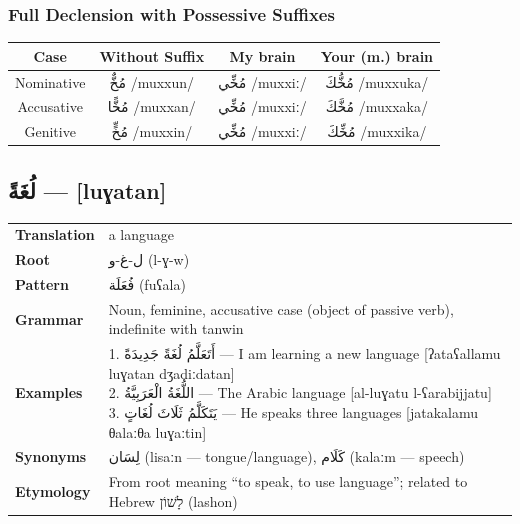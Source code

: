 \documentclass[letterpaper,12pt]{article}
\begin{document}
\subsubsection*{Full Declension with Possessive Suffixes}
\begin{tabular}{|c|c|c|c|}
\hline
\textbf{Case} & \textbf{Without Suffix} & \textbf{My brain} & \textbf{Your (m.) brain} \\
\hline
Nominative & \textarabic{مُخٌّ} /muxxun/ & \textarabic{مُخِّي} /muxxiː/ & \textarabic{مُخُّكَ} /muxxuka/ \\
\hline
Accusative & \textarabic{مُخًّا} /muxxan/ & \textarabic{مُخِّي} /muxxiː/ & \textarabic{مُخَّكَ} /muxxaka/ \\
\hline
Genitive & \textarabic{مُخٍّ} /muxxin/ & \textarabic{مُخِّي} /muxxiː/ & \textarabic{مُخِّكَ} /muxxika/ \\
\hline
\end{tabular}

\subsection{\textarabic{لُغَةً} — [luɣatan]}
\begin{tabular}{p{3cm}p{10cm}}
\toprule
\textbf{Translation} & a language \\
\textbf{Root} & \textarabic{ل-غ-و} (l-ɣ-w) \\
\textbf{Pattern} & \textarabic{فُعَلَة} (fuʕala) \\
\textbf{Grammar} & Noun, feminine, accusative case (object of passive verb), indefinite with tanwin \\
\midrule
\textbf{Examples} & \makecell[l]{\parbox{9.5cm}{
1. \textarabic{أَتَعَلَّمُ لُغَةً جَدِيدَةً} — I am learning a new language [ʔataʕallamu luɣatan dʒadiːdatan]\\
2. \textarabic{اللُّغَةُ الْعَرَبِيَّةُ} — The Arabic language [al-luɣatu l-ʕarabijjatu]\\
3. \textarabic{يَتَكَلَّمُ ثَلَاثَ لُغَاتٍ} — He speaks three languages [jatakalamu θalaːθa luɣaːtin]
}} \\
\midrule
\textbf{Synonyms} & \textarabic{لِسَان} (lisaːn — tongue/language), \textarabic{كَلَام} (kalaːm — speech) \\
\textbf{Etymology} & From root meaning ``to speak, to use language''; related to Hebrew \texthebrew{לָשׁוֹן} (lashon) \\
\bottomrule
\end{tabular}
\end{document}
